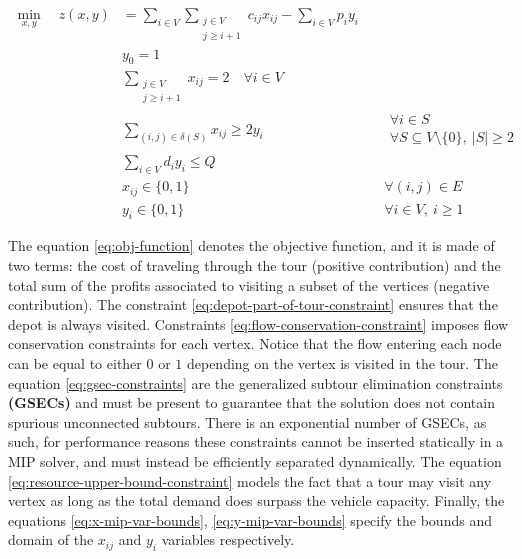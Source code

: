 \begin{align}
	\min_{x,y} \quad z(x, y) & =  \sum_{i \in V} \sum_{\substack{j \in V                                                                                \\ j \ge i + 1}} c_{ij} x_{ij} - \sum_{i \in V} p_i y_i \label{eq:obj-function}\\
	                         & y_0 = 1                                           & \label{eq:depot-part-of-tour-constraint}                             \\
	                         & \sum_{\substack{j \in V                                                                                                  \\ j \ge i + 1}}       x_{ij}    = 2 \quad \forall i \in V         \label{eq:flow-conservation-constraint}\\
	                         & \sum_{(i, j) \in \delta(S)} x_{ij} \ge 2 y_{i}    & \quad \substack{\forall i \in S                                      \\ \forall S \subseteq V \setminus \{ 0 \},\ |S| \ge 2} \label{eq:gsec-constraints} \\
	                         & \sum_{i \in V} d_i y_i   \le Q                    & \label{eq:resource-upper-bound-constraint}                           \\
	                         & x_{ij}                   \in \lbrace 0, 1 \rbrace & \quad \forall (i, j) \in E               \label{eq:x-mip-var-bounds} \\
	                         & y_{i}                    \in \lbrace 0, 1 \rbrace & \quad \forall i \in V,\ i \ge 1          \label{eq:y-mip-var-bounds}
\end{align}

The equation \eqref{eq:obj-function} denotes the objective function, and it is made of two terms: the cost of traveling through the tour (positive contribution) and the total sum of the profits associated to visiting a subset of the vertices (negative contribution).
The constraint \eqref{eq:depot-part-of-tour-constraint} ensures that the depot is always visited.
Constraints \eqref{eq:flow-conservation-constraint} imposes flow conservation constraints for each vertex.
Notice that the flow entering each node can be equal to either $0$ or $1$ depending on the vertex is visited in the tour.
The equation \eqref{eq:gsec-constraints} are the generalized subtour elimination constraints \textbf{(GSECs)} and must be present to guarantee that the solution does not contain spurious unconnected subtours.
There is an exponential number of GSECs, as such, for performance reasons these constraints cannot be inserted statically in a MIP solver, and must instead be efficiently separated dynamically.
The equation \eqref{eq:resource-upper-bound-constraint} models the fact that a tour may visit any vertex as long as the total demand does surpass the vehicle capacity.
Finally, the equations \eqref{eq:x-mip-var-bounds}, \eqref{eq:y-mip-var-bounds} specify the bounds and domain of the $x_{ij}$ and $y_{i}$ variables respectively.

